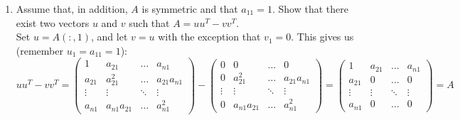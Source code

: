 \documentclass[11pt]{article}
\newcommand{\n}{\vspace{0.2cm}}
\begin{document}
\begin{enumerate}
\begin{enumerate}[label=(\alph*)]
\begin{proof}
			            Now, if only the first row of \(A\) is filled out, then we can choose any nonzero column \(u\), and every other column is just a multiple of \(u\), making \(\text{rank}(A) = 1\).  Similarly, if only the first column (call it \(v\)) of \(A\) is filled out, then every other column is just \(0 \cdot v\).  So again, \(\text{rank}(A) = 1\) \n

			            Finally if both the first row and column of \(A\) are filled out, choose vector \(u\) to be the first column of \(A\), and vector \(v\) to be any other column with a nonzero element in the first row.  Since every other column of \(A\) is just a multiple of \(v\), we know \(u,v\) span the range of \(A\), making \(\text{rank}(A) = 2\)\n
		            \end{proof}


		      \item Assume that, in addition, \(A\) is symmetric and that \(a_{11} = 1\).  Show that there exist two vectors \(u\) and \(v\) such that \(A = uu^T - vv^T\). \n\\
		            Set \(u = A(:,1)\), and let \(v = u\) with the exception that \(v_1 = 0\).  This gives us (remember \(u_1 = a_{11} = 1\)):
		            \[uu^T - vv^T =
			            \begin{pmatrix} 1 & a_{21} & \hdots & a_{n1} \\ a_{21} & a_{21}^2 & \hdots & a_{21}a_{n1}  \\ \vdots & \vdots & \ddots & \vdots \\ a_{n1} & a_{n1}a_{21} & \hdots & a_{n1}^2
			            \end{pmatrix} -
			            \begin{pmatrix} 0 & 0 & \hdots & 0 \\ 0 & a_{21}^2 & \hdots & a_{21}a_{n1}  \\ \vdots & \vdots & \ddots & \vdots \\ 0 & a_{n1}a_{21} & \hdots & a_{n1}^2
			            \end{pmatrix} =
			            \begin{pmatrix} 1 & a_{21} & \hdots & a_{n1} \\ a_{21} & 0 & \hdots & 0 \\ \vdots & \vdots & \ddots & \vdots \\ a_{n1} & 0 & \hdots & 0
			            \end{pmatrix} = A
		            \]
	      \end{enumerate}


\end{enumerate}
\end{document}
